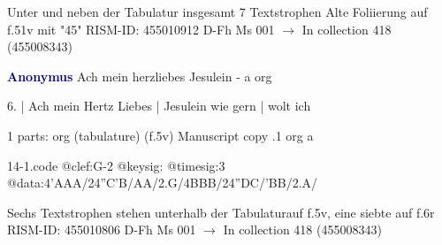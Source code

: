 \documentclass[twocolumn]{book}
\begin{document}
\newline Unter und neben der Tabulatur insgesamt 7 Textstrophen
\newline Alte Foliierung auf f.51v mit "45"
\newline RISM-ID: 455010912
\newline D-Fh  Ms 001
\newline $\rightarrow$ In collection 418 (455008343)
      
\newline \par \vspace{7pt} \textcolor{darkblue}{\textbf{Anonymus  }}
\newline Ach mein herzliebes Jesulein - a
\newline org
\newline \begin{itshape}[f.5v, at left:] 6. | Ach mein Hertz Liebes | Jesulein wie gern | wolt ich\end{itshape} 
\newline \textcolor{darkblue}{}  1 parts: org (tabulature)  (f.5v)
\newline Manuscript copy
.1  org  a
\newline \begin{footnotesize}  \end{footnotesize}  
\begin{filecontents*}{14-1.code}
@clef:G-2
@keysig:
@timesig:3
@data:4'AAA/24''C'B/AA/2.G/4BBB/24''DC/'BB/2.A/
\end{filecontents*}
\newline
%

\newline Sechs Textstrophen stehen unterhalb der Tabulaturauf f.5v, eine siebte auf f.6r
\newline RISM-ID: 455010806
\newline D-Fh  Ms 001
\newline $\rightarrow$ In collection 418 (455008343)
      
\end{document}
